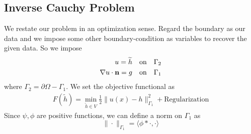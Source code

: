 \documentclass{note}
\begin{document}
\subsection{Inverse Cauchy Problem}
We restate our problem in an optimization sense. Regard the boundary as our data and we impose some other boundary-condition as variables to recover the given data. So we impose
\begin{eqnarray}
u  = \widetilde{h} \quad\mbox{on}\quad \Gamma_2 \\
\nabla u \cdot \mathbf{n} = g \quad\mbox{on}\quad \Gamma_1
\end{eqnarray}
where $\Gamma_2 = \partial\Omega-\Gamma_1$. We set the objective functional as
\begin{eqnarray}
F(\widetilde{h}) = \min_{\widetilde{h}\in V} \frac{1}{2}\|u(x) - h\|_{\Gamma_1}^2 + \mbox{Regularization}
\end{eqnarray}
Since $\psi, \phi$ are positive functions, we can define a norm on $\Gamma_1$ as
 $$\|\cdot\|_{\Gamma_1} = \langle\phi*\cdot,\cdot\rangle$$
\end{document}
